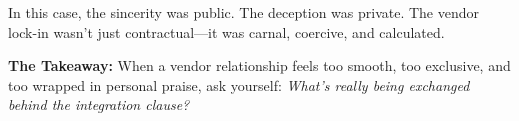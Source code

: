 In this case, the sincerity was public. The deception was private.  
The vendor lock-in wasn’t just contractual—it was carnal, coercive, and calculated.

\medskip

\textbf{The Takeaway:}  
When a vendor relationship feels too smooth, too exclusive, and too wrapped in personal praise, ask yourself:  
\textit{What’s really being exchanged behind the integration clause?}
